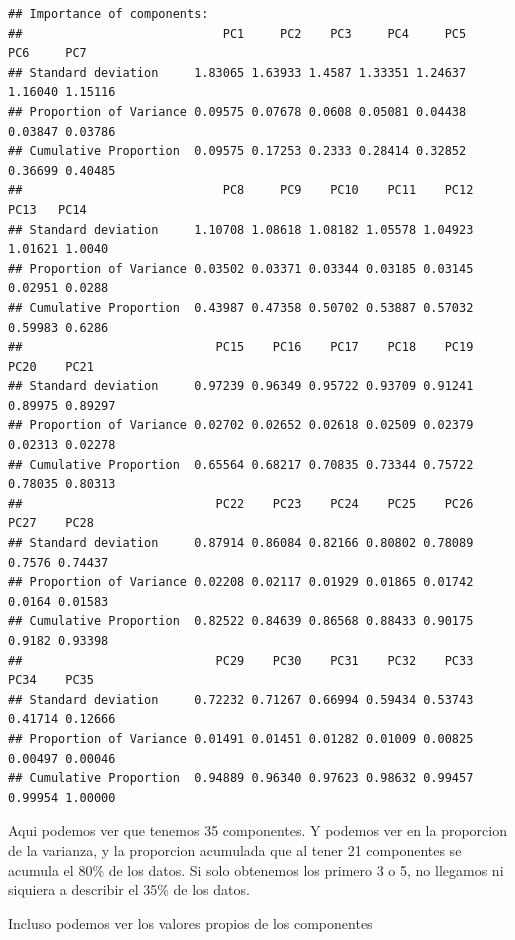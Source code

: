 \documentclass[
]{article}
\newenvironment{Shaded}{\begin{snugshade}}{\end{snugshade}}
\newcommand{\DecValTok}[1]{\textcolor[rgb]{0.00,0.00,0.81}{#1}}
\newcommand{\NormalTok}[1]{#1}
\newcommand{\OtherTok}[1]{\textcolor[rgb]{0.56,0.35,0.01}{#1}}
\newcommand{\SpecialCharTok}[1]{\textcolor[rgb]{0.81,0.36,0.00}{\textbf{#1}}}
\begin{document}
\begin{verbatim}
## Importance of components:
##                            PC1     PC2    PC3     PC4     PC5     PC6     PC7
## Standard deviation     1.83065 1.63933 1.4587 1.33351 1.24637 1.16040 1.15116
## Proportion of Variance 0.09575 0.07678 0.0608 0.05081 0.04438 0.03847 0.03786
## Cumulative Proportion  0.09575 0.17253 0.2333 0.28414 0.32852 0.36699 0.40485
##                            PC8     PC9    PC10    PC11    PC12    PC13   PC14
## Standard deviation     1.10708 1.08618 1.08182 1.05578 1.04923 1.01621 1.0040
## Proportion of Variance 0.03502 0.03371 0.03344 0.03185 0.03145 0.02951 0.0288
## Cumulative Proportion  0.43987 0.47358 0.50702 0.53887 0.57032 0.59983 0.6286
##                           PC15    PC16    PC17    PC18    PC19    PC20    PC21
## Standard deviation     0.97239 0.96349 0.95722 0.93709 0.91241 0.89975 0.89297
## Proportion of Variance 0.02702 0.02652 0.02618 0.02509 0.02379 0.02313 0.02278
## Cumulative Proportion  0.65564 0.68217 0.70835 0.73344 0.75722 0.78035 0.80313
##                           PC22    PC23    PC24    PC25    PC26   PC27    PC28
## Standard deviation     0.87914 0.86084 0.82166 0.80802 0.78089 0.7576 0.74437
## Proportion of Variance 0.02208 0.02117 0.01929 0.01865 0.01742 0.0164 0.01583
## Cumulative Proportion  0.82522 0.84639 0.86568 0.88433 0.90175 0.9182 0.93398
##                           PC29    PC30    PC31    PC32    PC33    PC34    PC35
## Standard deviation     0.72232 0.71267 0.66994 0.59434 0.53743 0.41714 0.12666
## Proportion of Variance 0.01491 0.01451 0.01282 0.01009 0.00825 0.00497 0.00046
## Cumulative Proportion  0.94889 0.96340 0.97623 0.98632 0.99457 0.99954 1.00000
\end{verbatim}

Aqui podemos ver que tenemos 35 componentes. Y podemos ver en la
proporcion de la varianza, y la proporcion acumulada que al tener 21
componentes se acumula el 80\% de los datos. Si solo obtenemos los
primero 3 o 5, no llegamos ni siquiera a describir el 35\% de los datos.

Incluso podemos ver los valores propios de los componentes

\begin{Shaded}
\end{Shaded}
\end{document}
